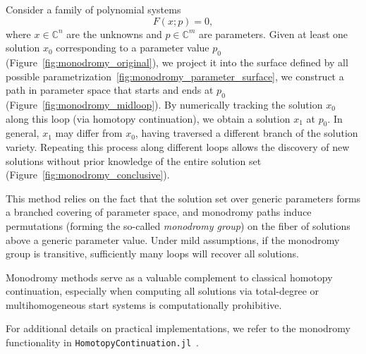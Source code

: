 Consider a family of polynomial systems
\[
F(x; p) = 0,
\]
where \( x \in \mathbb{C}^n \) are the unknowns and \( p \in \mathbb{C}^m \) are parameters. Given at least one solution \( x_0 \) corresponding to a parameter value \( p_0 \) (Figure~\ref{fig:monodromy_original}), we project it into the surface defined by all possible parametrization~\ref{fig:monodromy_parameter_surface}, we construct a path in parameter space that starts and ends at \( p_0 \) (Figure~\ref{fig:monodromy_midloop}). By numerically tracking the solution \( x_0 \) along this loop (via homotopy continuation), we obtain a solution \( x_1 \) at \( p_0 \). In general, \( x_1 \) may differ from \( x_0 \), having traversed a different branch of the solution variety. Repeating this process along different loops allows the discovery of new solutions without prior knowledge of the entire solution set (Figure~\ref{fig:monodromy_conclusive}).

This method relies on the fact that the solution set over generic parameters forms a branched covering of parameter space, and monodromy paths induce permutations (forming the so-called \emph{monodromy group}) on the fiber of solutions above a generic parameter value. Under mild assumptions, if the monodromy group is transitive, sufficiently many loops will recover all solutions.

Monodromy methods serve as a valuable complement to classical homotopy continuation, especially when computing all solutions via total-degree or multihomogeneous start systems is computationally prohibitive.

For additional details on practical implementations, we refer to the monodromy functionality in \texttt{HomotopyContinuation.jl}~\cite{HomotopyContinuationJL}.

